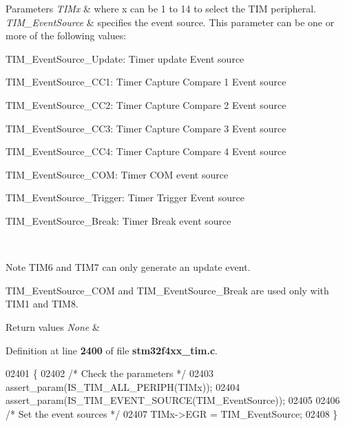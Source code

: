 \begin{DoxyParams}{Parameters}
{\em T\+I\+Mx} & where x can be 1 to 14 to select the T\+IM peripheral. \\
\hline
{\em T\+I\+M\+\_\+\+Event\+Source} & specifies the event source. This parameter can be one or more of the following values\+: \begin{DoxyItemize}
\item T\+I\+M\+\_\+\+Event\+Source\+\_\+\+Update\+: Timer update Event source \item T\+I\+M\+\_\+\+Event\+Source\+\_\+\+C\+C1\+: Timer Capture Compare 1 Event source \item T\+I\+M\+\_\+\+Event\+Source\+\_\+\+C\+C2\+: Timer Capture Compare 2 Event source \item T\+I\+M\+\_\+\+Event\+Source\+\_\+\+C\+C3\+: Timer Capture Compare 3 Event source \item T\+I\+M\+\_\+\+Event\+Source\+\_\+\+C\+C4\+: Timer Capture Compare 4 Event source \item T\+I\+M\+\_\+\+Event\+Source\+\_\+\+C\+OM\+: Timer C\+OM event source \item T\+I\+M\+\_\+\+Event\+Source\+\_\+\+Trigger\+: Timer Trigger Event source \item T\+I\+M\+\_\+\+Event\+Source\+\_\+\+Break\+: Timer Break event source\end{DoxyItemize}
\\
\hline
\end{DoxyParams}
\begin{DoxyNote}{Note}
T\+I\+M6 and T\+I\+M7 can only generate an update event. 

T\+I\+M\+\_\+\+Event\+Source\+\_\+\+C\+OM and T\+I\+M\+\_\+\+Event\+Source\+\_\+\+Break are used only with T\+I\+M1 and T\+I\+M8.
\end{DoxyNote}

\begin{DoxyRetVals}{Return values}
{\em None} & \\
\hline
\end{DoxyRetVals}


Definition at line \textbf{ 2400} of file \textbf{ stm32f4xx\+\_\+tim.\+c}.


\begin{DoxyCode}
02401 \{ 
02402   \textcolor{comment}{/* Check the parameters */}
02403   assert_param(IS_TIM_ALL_PERIPH(TIMx));
02404   assert_param(IS_TIM_EVENT_SOURCE(TIM\_EventSource));
02405  
02406   \textcolor{comment}{/* Set the event sources */}
02407   TIMx->EGR = TIM\_EventSource;
02408 \}
\end{DoxyCode}
\mbox{\label{group__TIM__Group5_ga0adcbbd5e838ec8642e7a9b80075f41f}} 
